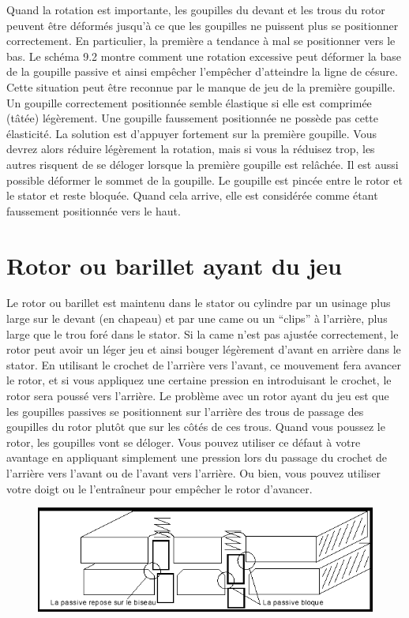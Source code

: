 \documentclass[a4paper,french,11pt,twoside]{report}
\begin{document}
Quand la rotation est importante, les goupilles du devant et les trous du rotor peuvent être déformés jusqu'à ce que les goupilles ne puissent plus se positionner correctement. En particulier, la première a tendance à mal se positionner vers le bas. Le schéma 9.2 montre comment une rotation excessive peut déformer la base de la goupille passive et ainsi empêcher l'empêcher d'atteindre la ligne de césure. Cette situation peut être reconnue par le manque de jeu de la première goupille. Un goupille correctement positionnée semble élastique si elle est comprimée (tâtée) légèrement. Une goupille faussement positionnée ne possède pas cette élasticité. La solution est d'appuyer fortement sur la première goupille. Vous devrez alors réduire légèrement la rotation, mais si vous la réduisez trop, les autres risquent de se déloger lorsque la première goupille est relâchée. Il est aussi possible déformer le sommet de la goupille. Le goupille est pincée entre le rotor et le stator et reste bloquée. Quand cela arrive, elle est considérée comme étant faussement positionnée vers le haut.

\section{Rotor ou barillet ayant du jeu}

Le rotor ou barillet est maintenu dans le stator ou cylindre par un usinage plus large sur le devant (en chapeau) et par une came ou un \enquote{clips} à l'arrière, plus large que le trou foré dans le stator. Si la came n'est pas ajustée correctement, le rotor peut avoir un léger jeu et ainsi bouger légèrement d'avant en arrière dans le stator. En utilisant le crochet de l'arrière vers l'avant, ce mouvement fera avancer le rotor, et si vous appliquez une certaine pression en introduisant le crochet, le rotor sera poussé vers l'arrière. Le problème avec un rotor ayant du jeu est que les goupilles passives se positionnent sur l'arrière des trous de passage des goupilles du rotor plutôt que sur les côtés de ces trous. Quand vous poussez le rotor, les goupilles vont se déloger. Vous pouvez utiliser ce défaut à votre avantage en appliquant simplement une pression lors du passage du crochet de l'arrière vers l'avant ou de l'avant vers l'arrière. Ou bien, vous pouvez utiliser votre doigt ou le l'entraîneur pour empêcher le rotor d'avancer.

\begin{figure}[h] \begin{center}
        \includegraphics[width=16cm]{images/Image21}
        \caption{}
\end{center} \end{figure}
\end{document}
